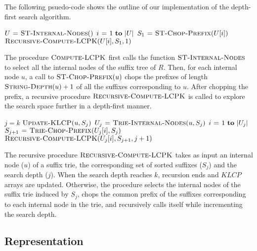 \documentclass{article}
\begin{document}
The following psuedo-code shows the outline of our implementation of the
depth-first search algorithm.
\begin{codebox}
 \li $U \mathrel{\hspace{1pt}=\hspace{1pt}} \textnormal{\scshape ST-Internal-Nodes}()$
 \li \For $i \gets 1 \To |U|$
 \li \Do $S_1 \mathrel{\hspace{1pt}=\hspace{1pt}} \textnormal{\scshape ST-Chop-Prefix}(U[i])$
 \li   $\textnormal{\scshape Recursive-Compute-LCPK}(U[i], S_1, 1)$
      \End
 \end{codebox}

The procedure $\textnormal{\scshape Compute-LCPK}$ first calls the function
$\textnormal{\scshape ST-Internal-Nodes}$ to select all the internal nodes of the
suffix tree of $R$. Then, for
each internal node $u$, a call to $\textnormal{\scshape ST-Chop-Prefix}(u)$ chops the
prefixes of length $\textnormal{\scshape String-Depth}(u) + 1$ of all the suffixes
corresponding to $u$. After chopping the prefix, a recursive procedure
$\textnormal{\scshape Recursive-Compute-LCPK}$ is called to explore the search
space further in a depth-first manner.

 \begin{codebox}
 \li \If $j = k$
 \li \Do  $\textnormal{\scshape Update-KLCP}(u, S_{j})$
 \li     \Return
     \End
 \li $U_j \mathrel{\hspace{1pt}=\hspace{1pt}} \textnormal{\scshape Trie-Internal-Nodes}(u, S_{j})$
 \li \For $i \gets 1 \To |U_{j}|$
 \li \Do $S_{j + 1} \mathrel{\hspace{1pt}=\hspace{1pt}} \textnormal{\scshape Trie-Chop-Prefix}(U_{j}[i], S_{j})$
 \li   $\textnormal{\scshape Recursive-Compute-LCPK}(U_{j}[i], S_{j + 1}, j + 1)$
      \End
\end{codebox}

The recursive procedure $\textnormal{\scshape Recursive-Compute-LCPK}$ takes as input
an internal node ($u$) of a suffix trie, the corresponding set of sorted
suffixes ($S_j$) and the search depth ($j$). When the search depth
reaches $k$, recursion ends and $KLCP$ arrays are updated. Otherwise,
the procedure selects the internal nodes of the suffix trie induced by
$S_j$, chops the common prefix of the suffixes corresponding to each
internal node in the trie, and recursively calls itself while
incrementing the search depth.

\subsection{Representation}
\end{document}
